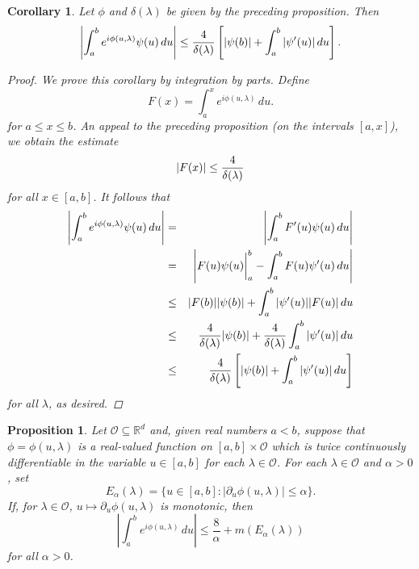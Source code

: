 \documentclass[11pt]{article}
\newtheorem{corollary}[theorem]{Corollary}
\newtheorem{proposition}[theorem]{Proposition}
\newcommand{\lb}{\left[}
\newcommand{\rb}{\right]}
\newcommand{\f}[2]{\frac{#1}{#2}}
\begin{document}
\begin{corollary}\label{cor:DeltaLambda}
Let $\phi$ and $\delta(\lambda)$ be given by the preceding proposition. Then
\begin{equation*}
    \left|\int_a^b e^{i\phi(u,\lambda)} \psi(u)\,du \right| \leq \f{4}{\delta(\lambda)}\lb \abs{\psi(b)} + \int_a^b \abs{\psi'(u)}\,du \rb.
\end{equation*}

\begin{proof}
We prove this corollary by integration by parts. Define
\begin{equation*}
    F(x) = \int_a^x e^{i \phi(u,\lambda)}\,du.
\end{equation*}
for $a\leq x\leq b$. An appeal to the preceding proposition (on the intervals $[a,x]$), we obtain the estimate
\begin{equation*}
    \abs{F(x)} \leq \f{4}{\delta(\lambda)}
\end{equation*}
for all $x\in [a,b]$. It follows that 
\begin{eqnarray*}
     \abs{\int_a^b e^{i \phi(u,\lambda)} \psi(u) \,du} 
     &=& \abs{\int_a^b F'(u)\psi(u)\,du}  \\
     &=& \abs{ F(u)\psi(u)\bigg\vert_{a}^b - \int_a^b F(u)\psi'(u)\,du   } \\
     &\leq& \abs{F(b)}\abs{ \psi(b)} + \int_a^b \abs{\psi'(u)}\abs{ F(u)}\, du  \\
     &\leq& \f{4}{\delta(\lambda)}\abs{\psi(b)} + \f{4}{\delta(\lambda)} \int_a^b \abs{\psi'(u)}\,du\\
     &\leq& \f{4}{\delta(\lambda)}\lb \abs{\psi(b)} + \int_a^b \abs{\psi'(u)}\,du \rb 
\end{eqnarray*}
for all $\lambda$, as desired.
\end{proof}

\end{corollary}

\begin{proposition}\label{prop:EAlpha}
Let $\mathcal{O}\subseteq\mathbb{R}^d$ and, given real numbers $a<b$, suppose that $\phi=\phi(u,\lambda)$ is a real-valued function on $[a,b]\times\mathcal{O}$ which is twice continuously differentiable in the variable $u\in [a,b]$ for each $\lambda\in\mathcal{O}$. For each $\lambda\in\mathcal{O}$ and $\alpha>0$, set
\begin{equation*}
    E_{\alpha}(\lambda)=\{u\in[a,b]:|\partial_u \phi(u,\lambda)|\leq\alpha\}.
\end{equation*}
If, for $\lambda\in\mathcal{O}$, $u\mapsto \partial_u\phi(u,\lambda)$ is monotonic, then
\begin{equation*}
\left|\int_a^b e^{i\phi(u,\lambda)}\,du\right| \leq \frac{8}{\alpha}+m(E_\alpha(\lambda))
\end{equation*}
for all $\alpha>0$.
\end{proposition}
\end{document}
